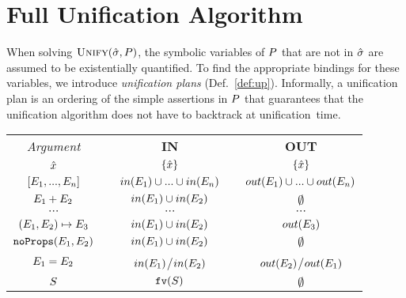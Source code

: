 
\section{Full Unification Algorithm}

When solving $\textsc{Unify}(\hat{\sigma}, P)$, the symbolic variables of $P$ that are not 
in $\hat{\sigma}$ are assumed to be existentially quantified. 
To find the appropriate bindings for these variables, we 
introduce \emph{unification plans} (Def.~\ref{def:up}).
Informally, a unification plan is an ordering of the simple assertions in $P$ that 
guarantees that the unification algorithm does not have to backtrack at unification~time. 

\vspace{-0.2cm}
\begin{table}[!h]
{\small \begin{tabular}{@{}c@{}ccc@{}c@{}}\toprule
\emph{Argument} & & \textbf{IN}  & & \textbf{OUT}  \\
\cmidrule{1-1} \cmidrule{3-3} \cmidrule{5-5}

$\hat{x}$                                                       & & $\{ \hat{x} \}$                                                          & & $\{ \hat{x} \}$    \\
$[ E_1, ..., E_n ]$                     & & $in(E_1) \cup ... \cup in(E_n)$      & & $out(E_1) \cup ... \cup out(E_n)$ \\
$E_1 + E_2$                                    & & $in(E_1) \cup in(E_2)$                  & & $\emptyset$ \\
$\cdots$ & & $\cdots$ & & $\cdots$ \\[1pt]
$(E_1, E_2)\mapsto E_3$   & & $in(E_1) \cup in(E_2)$ & & $out(E_3)$  \\
%
$\texttt{noProps}(E_1, E_2)$           &  & $in(E_1) \cup in(E_2)$ & & $\emptyset$ \\
%
$E_1 = E_2$                               & & $in(E_1)$/$in(E_2)$      & & $out(E_2)$/$out(E_1)$ \\
%
$S$                                                    & & $\texttt{fv}(S)$                                           & & $\emptyset$ \\
\bottomrule
\end{tabular}}
\vspace{-0.3cm}
\end{table}

